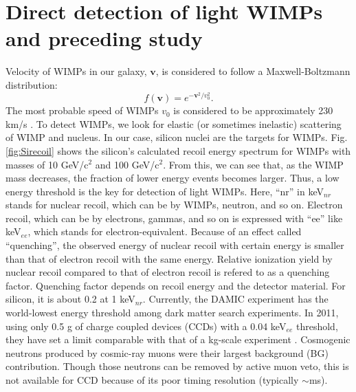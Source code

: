 \documentclass[12pt]{article}
\begin{document}
\section{Direct detection of light WIMPs and preceding study}
Velocity of WIMPs in our galaxy, $\bm{v}$, is considered to follow a Maxwell-Boltzmann distribution:
\[
f(\bm{v}) = e^{-\bm{v}^2/v_0^2}.
\]
The most probable speed of WIMPs $v_0$  is considered to be approximately 230 km/s \cite{Lewin:1995rx}. To detect WIMPs, we look for elastic (or sometimes inelastic) scattering of WIMP and nucleus.  In our case, silicon nuclei are the  targets for WIMPs.  Fig. \ref{fig:Sirecoil} shows the silicon's calculated recoil energy spectrum for WIMPs with masses of 10 GeV/c$^2$ and 100 GeV/c$^2$.  From this, we can see that, as the WIMP mass decreases, the fraction of lower energy events becomes larger.  Thus, a low energy threshold is the key for detection of light WIMPs.  Here, ``nr'' in keV$_{nr}$ stands for nuclear recoil, which can be by WIMPs, neutron, and so on.  Electron recoil, which can be by electrons, gammas, and so on is expressed with ``ee'' like keV$_{ee}$, which stands for electron-equivalent.  Because of an effect called ``quenching'', the observed energy of nuclear recoil with certain energy is smaller than that of electron recoil with the same energy.  Relative ionization yield by nuclear recoil compared to that of electron recoil is refered to as a quenching factor. Quenching factor depends on recoil energy and the detector material.  For silicon, it is about 0.2 at 1 keV$_{nr}$.  Currently, the DAMIC experiment has the world-lowest energy threshold among dark matter search experiments.  In 2011, using only 0.5 g of charge coupled devices (CCDs) with a 0.04 keV$_{ee}$ threshold, they have set a limit comparable with that of a kg-scale experiment \cite{Barreto:2011zu}.  Cosmogenic neutrons produced by cosmic-ray muons were their largest background (BG) contribution. Though those neutrons can be removed by active muon veto, this is not available for CCD because of its poor timing resolution (typically $\sim$ms).
\end{document}
